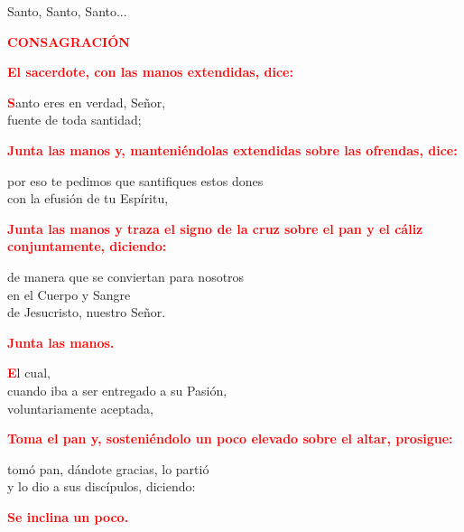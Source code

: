 \documentclass[12pt, letterpaper, spanish]{report}
\begin{document}
Santo, Santo, Santo...\newline

\Large {\bfseries \textcolor{red}{CONSAGRACI\'ON}} \newline

\large{\bfseries \textcolor{red}{El sacerdote, con las manos extendidas, dice:}}\newline

\Large \lettrine{\bfseries \textcolor{red}{S}}{}anto eres en verdad, Se\~nor,\\
fuente de toda santidad;\newline

\large{\bfseries \textcolor{red}{Junta las manos y, manteni\'endolas extendidas sobre las ofrendas, dice:}}\newline

\Large por eso te pedimos que santifiques estos dones\\
con la efusi\'on de tu Esp\'iritu,\newline

\large{\bfseries \textcolor{red}{Junta las manos y traza el signo de la cruz sobre el pan y el c\'aliz conjuntamente, diciendo:}}\newline

\Large de manera que se conviertan para nosotros\\
en el Cuerpo y \Huge{\textcolor{red}{}} \Large Sangre\\
de Jesucristo, nuestro Se\~nor.\newline

\large{\bfseries \textcolor{red}{Junta las manos.}}\newline

\Large \lettrine{\bfseries \textcolor{red}{E}}{}l cual,\\
cuando iba a ser entregado a su Pasi\'on,\\
voluntariamente aceptada,\newline

\large{\bfseries \textcolor{red}{Toma el pan y, sosteni\'endolo un poco elevado sobre el altar, prosigue:}}\newline

\Large tom\'o pan, d\'andote gracias, lo parti\'o\\
y lo dio a sus disc\'ipulos, diciendo:\newline

\large{\bfseries \textcolor{red}{Se inclina un poco.}} \newline
\end{document}
